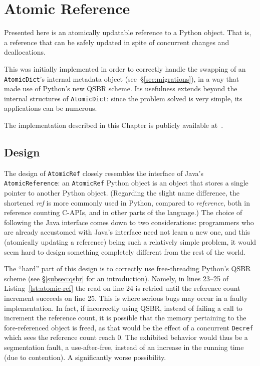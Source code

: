 \chapter{Atomic Reference}\label{ch:atomic-reference}

Presented here is an atomically updatable reference to a Python object.
That is, a reference that can be safely updated in spite of concurrent changes and deallocations.

This was initially implemented in order to correctly handle the swapping of an \texttt{AtomicDict}'s internal metadata object (see~\S\ref{sec:migrations}), in a way that made use of Python's new QSBR scheme.
Its usefulness extends beyond the internal structures of \texttt{AtomicDict}: since the problem solved is very simple, its applications can be numerous.

The implementation described in this Chapter is publicly available at~\cite[src/cereggii/atomic\_ref.c]{cereggii}.


\section{Design}\label{sec:design}

The design of \texttt{AtomicRef} closely resembles the interface of Java's \texttt{AtomicReference}: an \texttt{AtomicRef} Python object is an object that stores a single pointer to another Python object.
(Regarding the slight name difference, the shortened \emph{ref} is more commonly used in Python, compared to \emph{reference}, both in reference counting C-APIs, and in other parts of the language.)
The choice of following the Java interface comes down to two considerations: programmers who are already accustomed with Java's interface need not learn a new one, and this (atomically updating a reference) being such a relatively simple problem, it would seem hard to design something completely different from the rest of the world.

The ``hard'' part of this design is to correctly use free-threading Python's QSBR scheme (see \S\ref{subsec:qsbr} for an introduction).
Namely, in lines 23--25 of Listing~\ref{lst:atomic-ref} the read on line 24 is retried until the reference count increment succeeds on line 25.
This is where serious bugs may occur in a faulty implementation.
In fact, if incorrectly using QSBR, instead of failing a call to increment the reference count, it is possible that the memory pertaining to the fore-referenced object is freed, as that would be the effect of a concurrent \texttt{Decref} which sees the reference count reach 0.
The exhibited behavior would thus be a segmentation fault, a use-after-free, instead of an increase in the running time (due to contention).
A significantly worse possibility.

